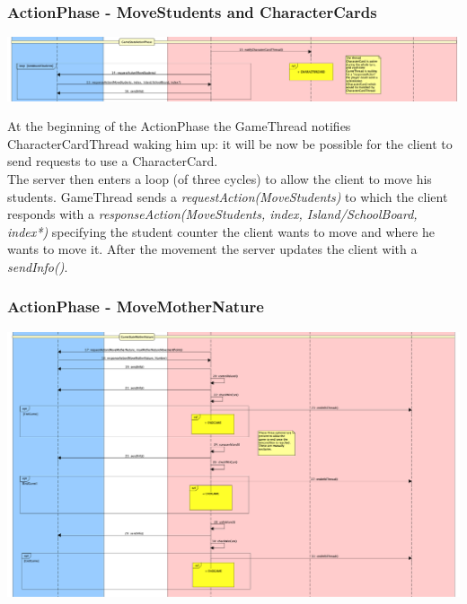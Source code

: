 \documentclass[12pt]{article}
\begin{document}
			\subsubsection{ActionPhase - MoveStudents and CharacterCards}
			
				\begin{center}
					\includegraphics[width=\textwidth,height=\textheight,keepaspectratio]{Game_2}
				\end{center}
				
				At the beginning of the ActionPhase the GameThread notifies CharacterCardThread waking him up: it will be now be possible for the client to send requests to use a CharacterCard. \\
				The server then enters a loop (of three cycles) to allow the client to move his students. GameThread sends a \emph{requestAction(MoveStudents)} to which the client responds with a \emph{responseAction(MoveStudents, index, Island/SchoolBoard, index*)} specifying the student counter the client wants to move and where he wants to move it. After the movement the server updates the client with a \emph{sendInfo()}.
								
			\subsubsection{ActionPhase - MoveMotherNature}
			
				\begin{center}
					\includegraphics[width=\textwidth,height=\textheight,keepaspectratio]{Game_3}
				\end{center}
				
\end{document}
